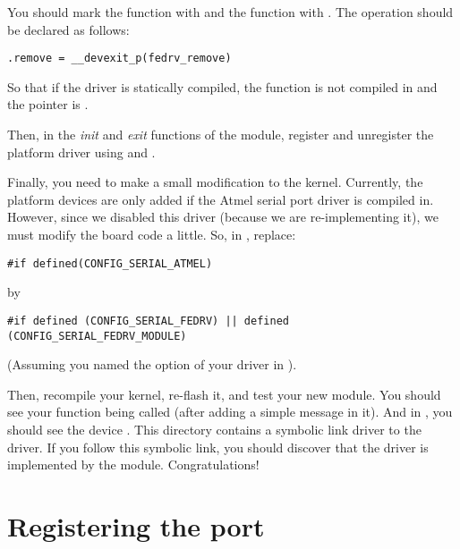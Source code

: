 You should mark the  function with  and
the 
function with . The  operation should be declared as
follows:

\begin{verbatim}
.remove = __devexit_p(fedrv_remove)
\end{verbatim}

So that if the driver is statically compiled, the
 function is not compiled in and the
 pointer is .

Then, in the \emph{init} and \emph{exit} functions of the module, register and
unregister the platform driver using
 and
.

Finally, you need to make a small modification to the
kernel. Currently, the  platform devices are only added
if the Atmel serial port driver is compiled in. However, since we
disabled this driver (because we are re-implementing it), we must
modify the board code a little. So, in
, replace:

\begin{verbatim}
#if defined(CONFIG_SERIAL_ATMEL)
\end{verbatim}

by

\begin{verbatim}
#if defined (CONFIG_SERIAL_FEDRV) || defined (CONFIG_SERIAL_FEDRV_MODULE)
\end{verbatim}

(Assuming you named the option of your driver  in
).

Then, recompile your kernel, re-flash it, and test your new
module. You should see your  function being called
(after adding a simple  message in it). And in
, you should see the device
. This directory contains a symbolic link driver
to the  driver. If you follow this symbolic link,
you should discover that the  driver is implemented
by the  module. Congratulations!

\section{Registering the port}

